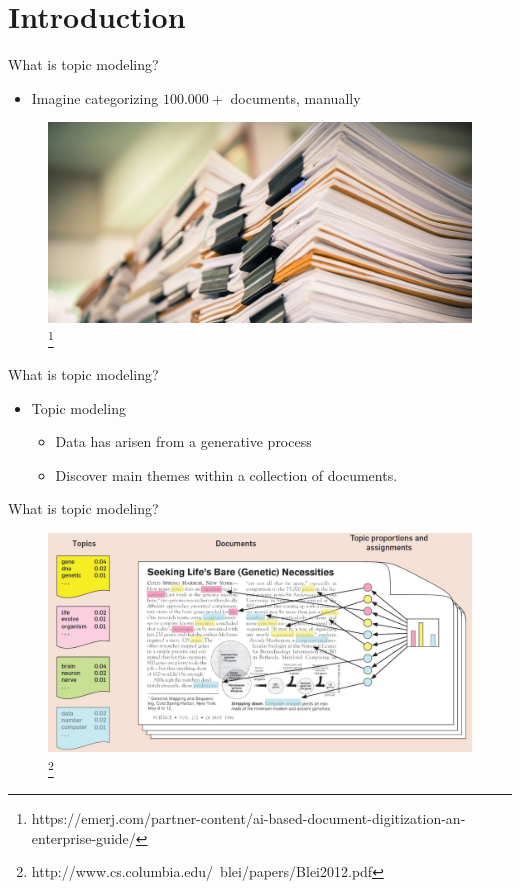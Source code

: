 \section{Introduction}

\begin{frame}{\insertsection}{What is topic modeling?}
	\begin{itemize}
		\item Imagine categorizing $100.000+$ documents, manually
	\end{itemize}
	\begin{figure}
		\includegraphics[width=\textwidth]{figures/documents.jpg}
		\let\thefootnote\relax\footnote{\tiny{https://emerj.com/partner-content/ai-based-document-digitization-an-enterprise-guide/}}
	\end{figure}
\end{frame}

\begin{frame}{\insertsection}{What is topic modeling?}
	\begin{itemize}
		\item Topic modeling
  		\begin{itemize}
			\item Data has arisen from a generative process
			\item Discover main themes within a collection of documents.
		\end{itemize}
	\end{itemize}
\end{frame}

\begin{frame}{\insertsection}{What is topic modeling?}
	\begin{figure}
		\includegraphics[width=\textwidth]{figures/topic_modeling_visual.JPG}
		\let\thefootnote\relax\footnote{\tiny{http://www.cs.columbia.edu/~blei/papers/Blei2012.pdf}}
	\end{figure}
\end{frame}

